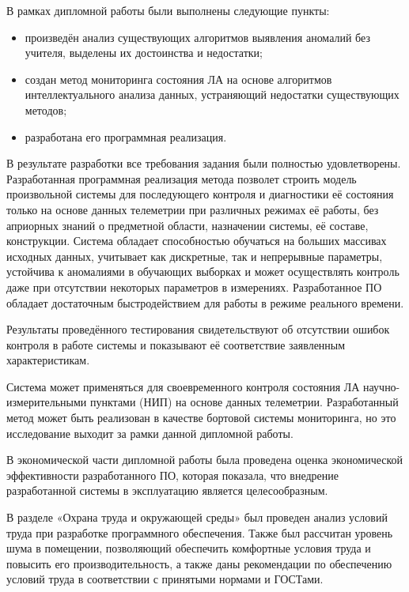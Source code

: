 В рамках дипломной работы были выполнены следующие пункты:
\begin{itemize} 
	\item произведён анализ существующих алгоритмов выявления аномалий без учителя, выделены их достоинства и недостатки;
	\item создан метод мониторинга состояния ЛА на основе алгоритмов интеллектуального анализа данных, устраняющий недостатки существующих методов;
	\item разработана его программная реализация.
\end{itemize}

В результате разработки все требования задания были полностью удовлетворены. Разработанная программная реализация метода позволет строить модель произвольной системы для последующего контроля и диагностики её состояния только на основе данных телеметрии при различных режимах её работы, без априорных знаний о предметной области, назначении системы, её составе, конструкции. Система обладает способностью обучаться на больших массивах исходных данных, учитывает как дискретные, так и непрерывные параметры, устойчива к аномалиями в обучающих выборках и может осуществлять контроль даже при отсутствии некоторых параметров в измерениях. Разработанное ПО обладает достаточным быстродействием для работы в режиме реального времени.

Результаты проведённого тестирования свидетельствуют об отсутствии ошибок контроля в работе системы и показывают её соответствие заявленным характеристикам.

Система может применяться для своевременного контроля состояния ЛА научно-измерительными пунктами (НИП) на основе данных телеметрии. Разработанный метод может быть реализован в качестве бортовой системы мониторинга, но это исследование выходит за рамки данной дипломной работы.

В экономической части дипломной работы была проведена оценка экономической эффективности разработанного ПО, которая показала, что внедрение разработанной системы в эксплуатацию является целесообразным.

В разделе «Охрана труда и окружающей среды» был проведен анализ условий труда при разработке программного обеспечения. Также был рассчитан уровень шума в помещении, позволяющий обеспечить комфортные условия труда и повысить его производительность, а также даны рекомендации по обеспечению условий труда в соответствии с принятыми нормами и ГОСТами.